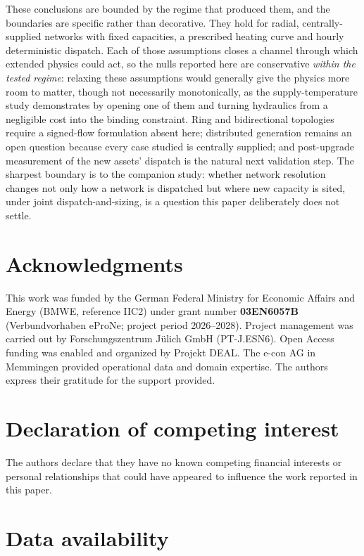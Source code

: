 \documentclass[a4paper,fleqn]{cas-sc}
\begin{document}
These conclusions are bounded by the regime that produced them, and the boundaries are
specific rather than decorative. They hold for radial, centrally-supplied networks with
fixed capacities, a prescribed heating curve and hourly deterministic dispatch. Each of
those assumptions closes a channel through which extended physics could act, so the nulls
reported here are conservative \emph{within the tested regime}: relaxing these assumptions would
generally give the physics more room to matter, though not necessarily monotonically, as the
supply-temperature study demonstrates by opening one of
them and turning hydraulics from a negligible cost into the binding constraint. Ring and
bidirectional topologies require a signed-flow formulation absent here; distributed
generation remains an open question because every case studied is centrally supplied; and
post-upgrade measurement of the new assets' dispatch is the natural next validation step.
The sharpest boundary is to the companion study: whether network resolution changes not only
how a network is dispatched but where new capacity is sited, under joint
dispatch-and-sizing, is a question this paper deliberately does not settle.

\section*{Acknowledgments}

This work was funded by the German Federal Ministry for Economic Affairs and Energy
(BMWE, reference IIC2) under grant number \textbf{03EN6057B} (Verbundvorhaben eProNe;
project period 2026--2028). Project management was carried out by Forschungszentrum
J\"ulich GmbH (PT-J.ESN6). Open Access funding was enabled and organized by Projekt DEAL.
The e-con AG in Memmingen provided operational data and domain expertise. The authors
express their gratitude for the support provided.

\section*{Declaration of competing interest}

The authors declare that they have no known competing financial interests or personal
relationships that could have appeared to influence the work reported in this paper.

\section*{Data availability}
\end{document}
